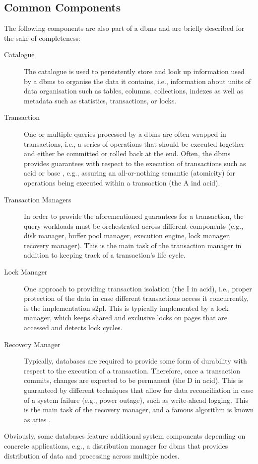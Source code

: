 \subsection{Common Components}

The following components are also part of a \acrshort{dbms} and are briefly described for the sake of completeness:

\begin{description}
    \item[Catalogue] The catalogue is used to persistently store and look up information used by a \acrshort{dbms} to organise the data it contains, i.e., information about units of data organisation such as tables, columns, collections, indexes as well as metadata such as statistics, transactions, or locks.
    \item[Transaction] One or multiple queries processed by a \acrshort{dbms} are often wrapped in transactions, i.e., a series of operations that should be executed together and either be committed or rolled back at the end. Often, the \acrshort{dbms} provides guarantees with respect to the execution of transactions such as \acrshort{acid} \cite{Haerder:1983principles} or \acrshort{base} \cite{Pritchett:2008Base}, e.g., assuring an all-or-nothing semantic (atomicity) for operations being executed within a transaction (the A ind \acrshort{acid}).
    \item[Transaction Managers] In order to provide the aforementioned guarantees for a transaction, the query workloads must be orchestrated across different components (e.g., disk manager, buffer pool manager, execution engine, lock manager, recovery manager). This is the main task of the transaction manager in addition to keeping track of a transaction's life cycle.
    \item[Lock Manager] One approach to providing transaction isolation (the I in \acrshort{acid}), i.e., proper protection of the data in case different transactions access it concurrently, is the implementation \acrfull{s2pl}. This is typically implemented by a lock manager, which keeps shared and exclusive locks on pages that are accessed and detects lock cycles.
    \item[Recovery Manager] Typically, databases are required to provide some form of durability with respect to the execution of a transaction. Therefore, once a transaction commits, changes are expected to be permanent (the D in \acrshort{acid}). This is guaranteed by different techniques that allow for data reconciliation in case of a system failure (e.g., power outage), such as write-ahead logging. This is the main task of the recovery manager, and a famous algorithm is known as \acrshort{aries} \cite{Mohan:1992Aries}.
\end{description}

Obviously, some databases feature additional system components depending on concrete applications, e.g., a distribution manager for \acrshort{dbms} that provides distribution of data and processing across multiple nodes.
